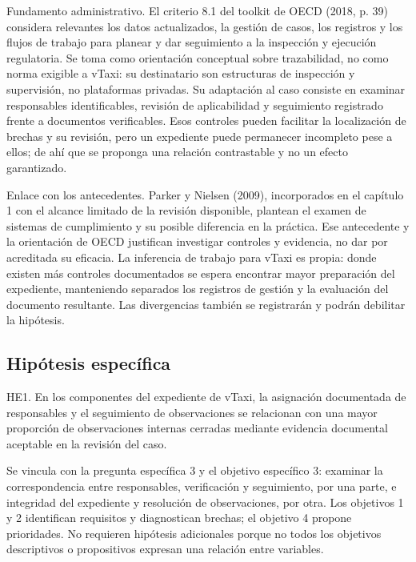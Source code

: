 {Fundamento administrativo. El criterio 8.1 del toolkit de OECD (2018, p. 39) considera relevantes los datos actualizados, la gestión de casos, los registros y los flujos de trabajo para planear y dar seguimiento a la inspección y ejecución regulatoria. Se toma como orientación conceptual sobre trazabilidad, no como norma exigible a vTaxi: su destinatario son estructuras de inspección y supervisión, no plataformas privadas. Su adaptación al caso consiste en examinar responsables identificables, revisión de aplicabilidad y seguimiento registrado frente a documentos verificables. Esos controles pueden facilitar la localización de brechas y su revisión, pero un expediente puede permanecer incompleto pese a ellos; de ahí que se proponga una relación contrastable y no un efecto garantizado.


Enlace con los antecedentes. Parker y Nielsen (2009), incorporados en el capítulo 1 con el alcance limitado de la revisión disponible, plantean el examen de sistemas de cumplimiento y su posible diferencia en la práctica. Ese antecedente y la orientación de OECD justifican investigar controles y evidencia, no dar por acreditada su eficacia. La inferencia de trabajo para vTaxi es propia: donde existen más controles documentados se espera encontrar mayor preparación del expediente, manteniendo separados los registros de gestión y la evaluación del documento resultante. Las divergencias también se registrarán y podrán debilitar la hipótesis.


\subsection{Hipótesis específica}
HE1. En los componentes del expediente de vTaxi, la asignación documentada de responsables y el seguimiento de observaciones se relacionan con una mayor proporción de observaciones internas cerradas mediante evidencia documental aceptable en la revisión del caso.


Se vincula con la pregunta específica 3 y el objetivo específico 3: examinar la correspondencia entre responsables, verificación y seguimiento, por una parte, e integridad del expediente y resolución de observaciones, por otra. Los objetivos 1 y 2 identifican requisitos y diagnostican brechas; el objetivo 4 propone prioridades. No requieren hipótesis adicionales porque no todos los objetivos descriptivos o propositivos expresan una relación entre variables.


}
